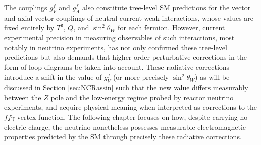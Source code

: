 The couplings $g^f_V$ and $g^f_A$ also constitute tree-level SM predictions for the vector and axial-vector couplings of neutral current weak interactions, whose values are fixed entirely by $T^3$, $Q$, and $\sin^2\theta_W$ for each fermion. However, current experimental precision in measuring observables of such interactions, most notably in neutrino experiments, has not only confirmed these tree-level predictions but also demands that higher-order perturbative corrections in the form of loop diagrams be taken into account. These radiative corrections introduce a shift in the value of $g^f_V$ (or more precisely $\sin^2\theta_W$) as will be discussed in Section \ref{sec:NCRassin} such that the new value differs measurably between the $Z$ pole and the low-energy regime probed by reactor neutrino experiments, and acquire physical meaning when interpreted as corrections to the $ff\gamma$ vertex function. The following chapter focuses on how, despite carrying no electric charge, the neutrino nonetheless possesses measurable electromagnetic properties predicted by the SM through precisely these radiative corrections.